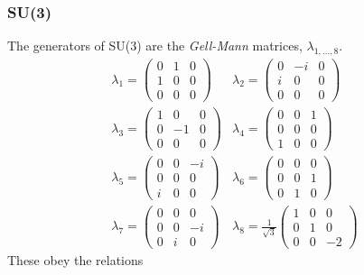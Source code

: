 \documentclass[]{dwnotes}
\begin{document}
\subsubsection{SU(3)}
The generators of SU(3) are
the \emph{Gell-Mann} matrices, $\lambda_{1,\dots,8}$.
\begin{equation*}
  \begin{matrix}
    \lambda_1 = \begin{pmatrix} 0 & 1 & 0 \\ 1 & 0 & 0 \\ 0 & 0 & 0  \end{pmatrix} &
    \lambda_2 = \begin{pmatrix} 0 & -i &0 \\ i & 0 & 0 \\ 0 & 0 & 0  \end{pmatrix} \\
    \lambda_3 = \begin{pmatrix} 1 & 0 & 0 \\ 0 & -1 & 0 \\ 0 & 0 & 0 \end{pmatrix} &
    \lambda_4 = \begin{pmatrix} 0 & 0 & 1 \\ 0 & 0 & 0 \\ 1 & 0 & 0  \end{pmatrix} \\
    \lambda_5 = \begin{pmatrix} 0 & 0 &-i \\ 0 & 0 & 0 \\ i & 0 & 0  \end{pmatrix} &
    \lambda_6 = \begin{pmatrix} 0 & 0 & 0 \\ 0 & 0 & 1 \\ 0 & 1 & 0  \end{pmatrix} \\
    \lambda_7 = \begin{pmatrix} 0 & 0 & 0 \\0 & 0 & -i \\ 0 & i & 0  \end{pmatrix} &
    \lambda_8 = \frac{1}{\sqrt{3}} \begin{pmatrix} 1 & 0 & 0 \\ 0 & 1 & 0 \\ 0 & 0 & -2 \end{pmatrix}
  \end{matrix}
\end{equation*}
These obey the relations
\end{document}
